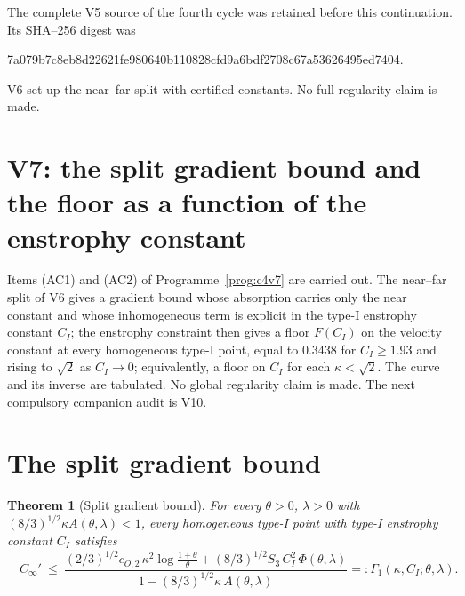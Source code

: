 \documentclass[11pt]{article}
\theoremstyle{plain}
\newtheorem{theorem}{Theorem}[section]
\theoremstyle{definition}
\theoremstyle{remark}
\begin{document}
The complete V5 source of the fourth cycle was retained before this
continuation.  Its SHA--256 digest was
\begin{center}\scriptsize\ttfamily
7a079b7c8eb8d22621fe980640b110828cfd9a6bdf2708c67a53626495ed7404.
\end{center}
V6 set up the near--far split with certified constants.  No full
regularity claim is made.

\section{V7: the split gradient bound and the floor as a function of the enstrophy constant}
\label{sec:c4v7-entry}

Items (AC1) and (AC2) of Programme~\ref{prog:c4v7} are carried out.
The near--far split of V6 gives a gradient bound whose absorption
carries only the near constant and whose inhomogeneous term is
explicit in the type-I enstrophy constant \(C_I\); the enstrophy
constraint then gives a floor \(F(C_I)\) on the velocity constant at
every homogeneous type-I point, equal to \(0.3438\) for \(C_I\ge1.93\) and rising
to \(\sqrt2\) as \(C_I\to0\); equivalently, a floor on \(C_I\) for each \(\kappa<\sqrt2\).  The
curve and its inverse are tabulated.  No global regularity claim is
made.  The next compulsory companion audit is V10.

\section{The split gradient bound}
\label{sec:c4v7-bound}

\begin{theorem}[Split gradient bound]
\label{thm:c4v7-gradient}
For every \(\theta>0\), \(\lambda>0\) with \((8/3)^{1/2}\kappa A(\theta,\lambda)<1\), every homogeneous
type-I point with type-I enstrophy constant \(C_I\) satisfies
\begin{equation}
 \boxed{\quad
 C_\infty'\ \le\ \frac{(2/3)^{1/2}c_{O,2}\,\kappa^2\log\frac{1+\theta}\theta+(8/3)^{1/2}S_3\,C_I^2\,\Phi(\theta,\lambda)}{1-(8/3)^{1/2}\kappa\,A(\theta,\lambda)}=:\Gamma_1(\kappa,C_I;\theta,\lambda) .
 \quad}
 \label{eq:c4v7-gradient}
\end{equation}
\end{theorem}
\end{document}
